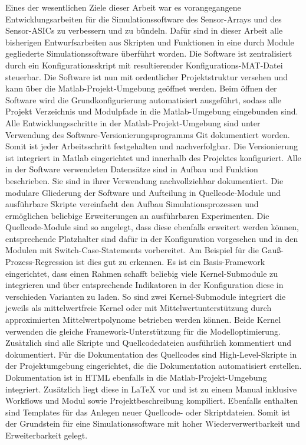 Eines der wesentlichen Ziele dieser Arbeit war es vorangegangene Entwicklungsarbeiten für die Simulationssoftware des Sensor-Arrays und des Sensor-ASICs zu verbessern und zu bündeln. Dafür sind in dieser Arbeit alle bisherigen Entwurfsarbeiten aus Skripten und Funktionen in eine durch Module gegliederte Simulationssoftware überführt worden. Die Software ist zentralisiert durch ein Konfigurationsskript mit resultierender Konfigurations-MAT-Datei steuerbar. Die Software ist nun mit ordentlicher Projektstruktur versehen und kann über die Matlab-Projekt-Umgebung geöffnet werden. Beim öffnen der Software wird die Grundkonfigurierung automatisiert ausgeführt, sodass alle Projekt Verzeichnis und Modulpfade in die Matlab-Umgebung eingebunden sind. Alle Entwicklungsschritte in der Matlab-Projekt-Umgebung sind unter Verwendung des Software-Versionierungsprogramms Git dokumentiert worden. Somit ist jeder Arbeitsschritt festgehalten und nachverfolgbar. Die Versionierung ist integriert in Matlab eingerichtet und innerhalb des Projektes konfiguriert. Alle in der Software verwendeten Datensätze sind in Aufbau und Funktion beschrieben. Sie sind in ihrer Verwendung nachvollziehbar dokumentiert. Die modulare Gliederung der Software und Aufteilung in Quellcode-Module und ausführbare Skripte vereinfacht den Aufbau Simulationsprozessen und ermöglichen beliebige Erweiterungen an ausführbaren Experimenten. Die Quellcode-Module sind so angelegt, dass diese ebenfalls erweitert werden können, entsprechende Platzhalter sind dafür in der Konfiguration vorgesehen und in den Modulen mit Switch-Case-Statements vorbereitet. Am Beispiel für die Gauß-Prozess-Regression ist dies gut zu erkennen. Es ist ein Basis-Framework eingerichtet, dass einen Rahmen schafft beliebig viele Kernel-Submodule zu integrieren und über entsprechende Indikatoren in der Konfiguration diese in verschieden Varianten zu laden. So sind zwei Kernel-Submodule integriert die jeweils als mittelwertfreie Kernel oder mit Mittelwertunterstützung durch approximierten Mittelwertpolynome betrieben werden können. Beide Kernel verwenden die gleiche Framework-Unterstützung für die Modelloptimierung. Zusätzlich sind alle Skripte und Quellcodedateien ausführlich kommentiert und dokumentiert. Für die Dokumentation des Quellcodes sind High-Level-Skripte in der Projektumgebung eingerichtet, die die Dokumentation automatisiert erstellen. Dokumentation ist in HTML ebenfalls in die Matlab-Projekt-Umgebung integriert. Zusätzlich liegt diese in LaTeX vor und ist zu einem Manual inklusive Workflows und Modul sowie Projektbeschreibung kompiliert. Ebenfalls enthalten sind Templates für das Anlegen neuer Quellcode- oder Skriptdateien. Somit ist der Grundstein für eine Simulationssoftware mit hoher Wiederverwertbarkeit und Erweiterbarkeit gelegt.
